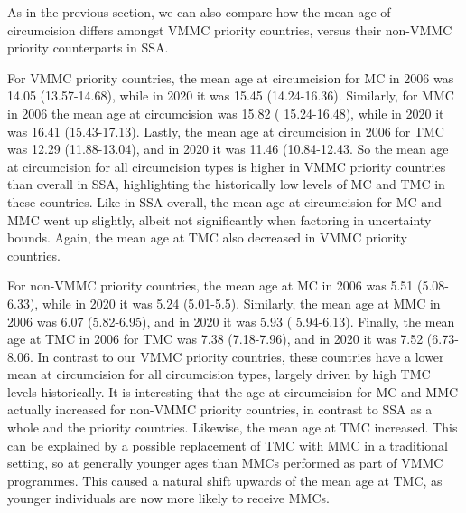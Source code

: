 \documentclass{article}
\begin{document}
As in the previous section, we can also compare how the mean age of circumcision differs amongst VMMC
priority countries, versus their non-VMMC priority counterparts in SSA.

For VMMC priority countries, the mean age at circumcision for MC in 2006 was 14.05 (13.57-14.68), while
in 2020 it was 15.45 (14.24-16.36). Similarly, for MMC in 2006 the mean age at circumcision was 15.82 (
15.24-16.48), while in 2020 it was 16.41 (15.43-17.13). Lastly, the mean age at circumcision in 2006 for
TMC was 12.29 (11.88-13.04), and in 2020 it was 11.46 (10.84-12.43. So the mean age at circumcision for
all circumcision types is higher in VMMC priority countries than overall in SSA, highlighting the historically
low levels of MC and TMC in these countries. Like in SSA overall, the mean age at circumcision for MC and
MMC went up slightly, albeit not significantly when factoring in uncertainty bounds. Again, the mean age at
TMC also decreased in VMMC priority countries.

For non-VMMC priority countries, the mean age at MC in 2006 was 5.51 (5.08-6.33), while in 2020 it was
5.24 (5.01-5.5). Similarly, the mean age at MMC in 2006 was 6.07 (5.82-6.95), and in 2020 it was 5.93 (
5.94-6.13). Finally, the mean age at TMC in 2006 for TMC was 7.38 (7.18-7.96), and in 2020 it was 7.52
(6.73-8.06. In contrast to our VMMC priority countries, these countries have a lower mean at circumcision
for all circumcision types, largely driven by high TMC levels historically. It is interesting that the age at
circumcision for MC and MMC actually increased for non-VMMC priority countries, in contrast to SSA as a
whole and the priority countries. Likewise, the mean age at TMC increased. This can be explained
by a possible replacement of TMC with MMC in a traditional setting, so at generally younger ages than
MMCs performed as part of VMMC programmes. This caused a natural shift upwards of the mean age at
TMC, as younger individuals are now more likely to receive MMCs.

\end{document}
